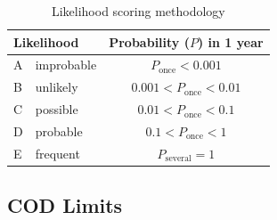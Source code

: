 \begin{table}[H]
\centering
\caption{Likelihood scoring methodology}
\label{tab:likelihood-methodology}
\begin{tabular}{@{}llc@{}}
\toprule
\multicolumn{2}{l}{Likelihood} & Probability ($P$) in 1 year              \\ \midrule
A & improbable & $         P_\mathrm{once} < 0.001 $ \\
B & unlikely   & $ 0.001 < P_\mathrm{once} < 0.01  $ \\
C & possible   & $ 0.01  < P_\mathrm{once} < 0.1   $ \\
D & probable   & $ 0.1   < P_\mathrm{once} < 1     $ \\
E & frequent   & $         P_\mathrm{several} = 1  $ \\ \bottomrule
\end{tabular}
\end{table}

\subsection{COD Limits}
\label{app:COD}

